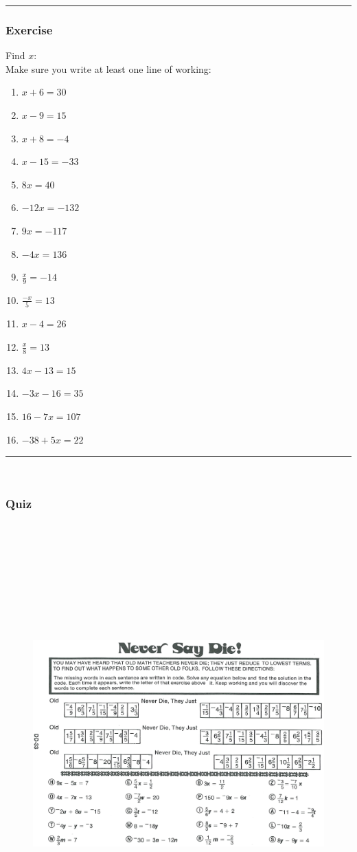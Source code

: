\documentclass[a4paper,12pt]{article}
\newcommand\question{
	 \rule[0pt]{17cm}{0.5pt}\vspace{-0.5cm}
	\subsubsection{Exercise}

}
\newcommand\questionend{
	\rule[0pt]{17cm}{0.5pt}\vspace{0.0cm}\\
}
\newcommand\quiz{
\subsubsection{Quiz}\vspace{-0.5cm}
}
\begin{document}
\question
Find $x$:\\
Make sure you write at least one line of working:
\begin{multicols}{3}
\begin{enumerate}[label=\normalsize \alph*)~~~]
\item $x + 6 = 30$
\item $x - 9 = 15$
\item $x + 8 = -4$
\item $x - 15 = -33$
\item $8x = 40$
\item $-12x = -132$
\item $9x = -117$
\item $-4x = 136$
\item $\displaystyle \frac{x}{9} = -14$
\item $\displaystyle \frac{-x}{5} = 13$
\item $x-4 = 26$
\item $\displaystyle \frac{x}{8} = 13$
\item $4x - 13 = 15$
\item $-3x - 16 = 35$
\item $16 - 7x = 107$
\item $-38 + 5x = 22$
\end{enumerate}
\end{multicols}
\questionend
\newpage
\quiz
\begin{figure}[!h]
	\centering
	\includegraphics[height=17cm, angle=90, origin=c]{pizzazz/pizzazz_set1_5.pdf}
\end{figure}
\newpage
\end{document}
